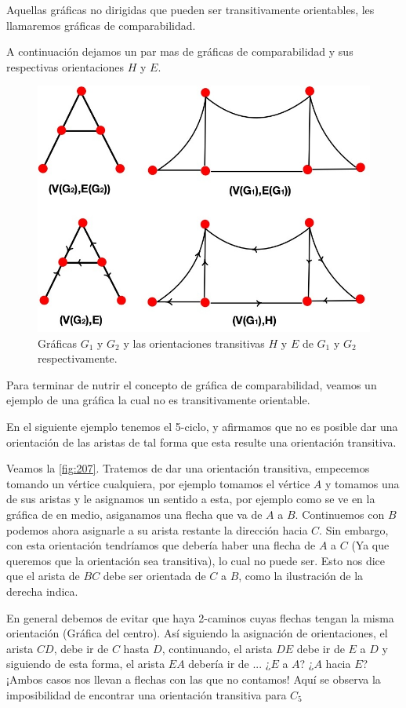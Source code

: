 Aquellas gráficas no dirigidas que pueden ser transitivamente orientables, les llamaremos gráficas de comparabilidad.

A continuación dejamos un par mas de gráficas de comparabilidad y sus respectivas orientaciones $H$ y $E$.

\begin{figure}[H]
  \centering
  \includegraphics[width=0.6
  \textwidth]{recursos/capturas/206.jpg}
  \caption{Gráficas $G_1$ y $G_2$ y las orientaciones transitivas $H$ y $E$ de $G_1$ y $G_2$ respectivamente.}
  \label{fig:206}
\end{figure}

Para terminar de nutrir el concepto de gráfica de comparabilidad, veamos un ejemplo de una gráfica la cual no es transitivamente orientable.


    \label{exmpl:206}
    En el siguiente ejemplo tenemos el 5-ciclo, y afirmamos que no es posible dar una orientación de las aristas de tal forma que esta resulte una orientación transitiva.
    
    Veamos la \cref{fig:207}.
    Tratemos de dar una orientación transitiva, empecemos tomando un vértice cualquiera, por ejemplo tomamos el vértice $A$ y tomamos una de sus aristas y le asignamos un sentido a esta, por ejemplo como se ve en la gráfica de en medio, asiganamos una flecha que va de $A$ a $B$.
    Continuemos con $B$ podemos ahora asignarle a su arista restante la dirección hacia $C$. Sin embargo, con esta orientación tendríamos que debería haber una flecha de $A$ a $C$ (Ya que queremos que la orientación sea transitiva), lo cual no puede ser. Esto nos dice que el arista de $BC$ debe ser orientada de $C$ a $B$, como la ilustración de la derecha indica.
    
    En general debemos de evitar que haya 2-caminos cuyas  flechas tengan la misma orientación (Gráfica del centro). Así siguiendo la asignación de orientaciones, el arista $CD$, debe ir de $C$ hasta $D$, continuando, el arista $DE$ debe ir de $E$ a $D$ y siguiendo de esta forma, el arista $EA$ debería ir de ... ¿$E$ a $A$? ¿$A$ hacia $E$? ¡Ambos casos nos llevan a flechas con las que no contamos!
    Aquí se observa la imposibilidad de encontrar una orientación transitiva para $C_5$


